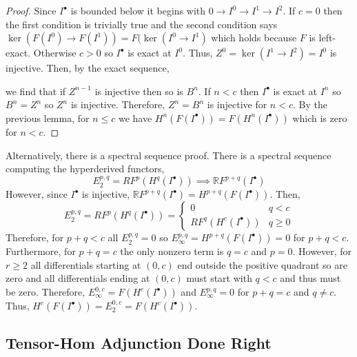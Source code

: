 \documentclass[12pt]{article}
\begin{document}
\begin{proof}
Since $I^\bullet$ is bounded below it begins with $0 \to I^0 \to I^1 \to I^2$. If $c = 0$ then the first condition is trivially true and the second condition says $\ker{(F(I^0) \to F(I^1))} = F(\ker{(I^0 \to I^1)}$ which holds because $F$ is left-exact. Otherwise $ c > 0$  so $I^\bullet$ is exact at $I^0$. Thus, $Z^0 = \ker{(I^1 \to I^2)} = I^0$ is injective. Then, by the exact sequence,
\begin{center}
\end{center}
we find that if $Z^{n-1}$ is injective then so is $B^{n}$. If $n < c$ then $I^\bullet$ is exact at $I^{n}$ so $B^{n} = Z^{n}$ so $Z^{n}$ is injective. Therefore, $Z^n = B^n$ is injective for $n < c$. By the previous lemma, for $n \le c$ we have $H^n(F(I^\bullet)) = F(H^n(I^\bullet))$ which is zero for $n < c$.
\end{proof}

\begin{rmk}
Alternatively, there is a spectral sequence proof. There is a spectral sequence computing the hyperderived functors,
\[ E^{p,q}_2 = R F^p(H^q(I^\bullet)) \implies \mathbb{R} F^{p + q}(I^\bullet) \]
However, since $I^\bullet$ is injective, $\mathbb{R} F^{p + q}(I^\bullet) = H^{p + q}(F(I^\bullet))$. Then,
\[ E^{p, q}_2 = R F^p(H^q(I^\bullet)) = 
\begin{cases}
0 & q < c
\\
R F^q(H^c(I^\bullet)) & q \ge 0
\end{cases} \]
Therefore, for $p + q < c$ all $E^{p,q}_2 = 0$ so $E^{p,q}_\infty = H^{p+q}(F(I^\bullet)) = 0$ for $p + q < c$. Furthermore, for $p + q = c$ the only nonzero term is $q = c$ and $p = 0$. However, for $r \ge 2$ all differentials starting at $(0, c)$ end outside the positive quadrant so are zero and all differentials ending at $(0, c)$ must start with $q < c$ and thus must be zero. Therefore, $E^{0,c}_{\infty} = F(H^c(I^\bullet))$ and $E^{p, q}_{\infty} = 0$ for $p + q = c$ and $q \neq c$. Thus, $H^c(F(I^\bullet)) = E^{0,c}_2 = F(H^c(I^\bullet))$. 
\end{rmk}

\subsection{Tensor-Hom Adjunction Done Right}
\end{document}
